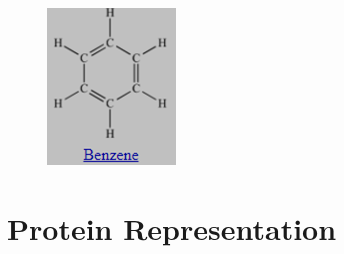 \documentclass[11pt, a4paper]{article}
\begin{document}
    \begin{figure}[H]
        \centering
        \begin{minipage}{0.2\textwidth}
        \includegraphics[width=\textwidth]{Benzene.png}
        \end{minipage}   
    \end{figure}

\section{Protein Representation}
\end{document}
